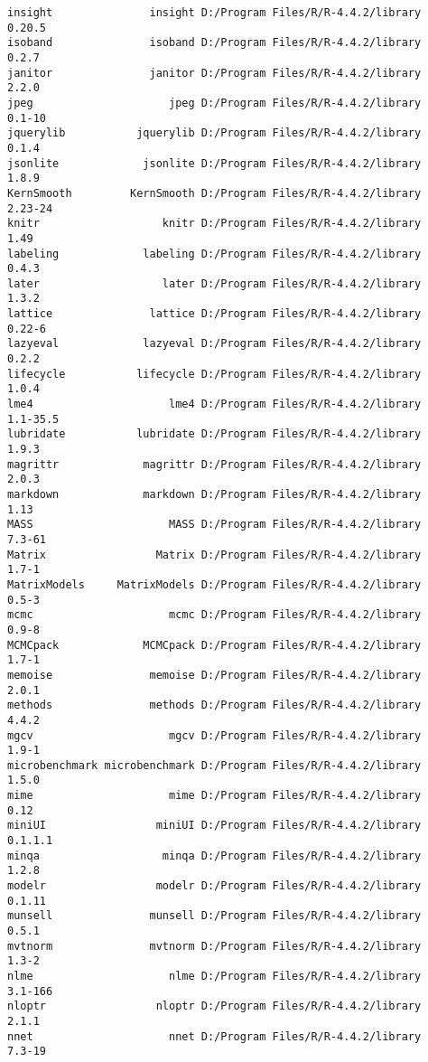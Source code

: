 \documentclass[
  letterpaper,
  DIV=11,
  numbers=noendperiod]{scrreprt}
\begin{document}
\begin{verbatim}
insight               insight D:/Program Files/R/R-4.4.2/library     0.20.5
isoband               isoband D:/Program Files/R/R-4.4.2/library      0.2.7
janitor               janitor D:/Program Files/R/R-4.4.2/library      2.2.0
jpeg                     jpeg D:/Program Files/R/R-4.4.2/library     0.1-10
jquerylib           jquerylib D:/Program Files/R/R-4.4.2/library      0.1.4
jsonlite             jsonlite D:/Program Files/R/R-4.4.2/library      1.8.9
KernSmooth         KernSmooth D:/Program Files/R/R-4.4.2/library    2.23-24
knitr                   knitr D:/Program Files/R/R-4.4.2/library       1.49
labeling             labeling D:/Program Files/R/R-4.4.2/library      0.4.3
later                   later D:/Program Files/R/R-4.4.2/library      1.3.2
lattice               lattice D:/Program Files/R/R-4.4.2/library     0.22-6
lazyeval             lazyeval D:/Program Files/R/R-4.4.2/library      0.2.2
lifecycle           lifecycle D:/Program Files/R/R-4.4.2/library      1.0.4
lme4                     lme4 D:/Program Files/R/R-4.4.2/library   1.1-35.5
lubridate           lubridate D:/Program Files/R/R-4.4.2/library      1.9.3
magrittr             magrittr D:/Program Files/R/R-4.4.2/library      2.0.3
markdown             markdown D:/Program Files/R/R-4.4.2/library       1.13
MASS                     MASS D:/Program Files/R/R-4.4.2/library     7.3-61
Matrix                 Matrix D:/Program Files/R/R-4.4.2/library      1.7-1
MatrixModels     MatrixModels D:/Program Files/R/R-4.4.2/library      0.5-3
mcmc                     mcmc D:/Program Files/R/R-4.4.2/library      0.9-8
MCMCpack             MCMCpack D:/Program Files/R/R-4.4.2/library      1.7-1
memoise               memoise D:/Program Files/R/R-4.4.2/library      2.0.1
methods               methods D:/Program Files/R/R-4.4.2/library      4.4.2
mgcv                     mgcv D:/Program Files/R/R-4.4.2/library      1.9-1
microbenchmark microbenchmark D:/Program Files/R/R-4.4.2/library      1.5.0
mime                     mime D:/Program Files/R/R-4.4.2/library       0.12
miniUI                 miniUI D:/Program Files/R/R-4.4.2/library    0.1.1.1
minqa                   minqa D:/Program Files/R/R-4.4.2/library      1.2.8
modelr                 modelr D:/Program Files/R/R-4.4.2/library     0.1.11
munsell               munsell D:/Program Files/R/R-4.4.2/library      0.5.1
mvtnorm               mvtnorm D:/Program Files/R/R-4.4.2/library      1.3-2
nlme                     nlme D:/Program Files/R/R-4.4.2/library    3.1-166
nloptr                 nloptr D:/Program Files/R/R-4.4.2/library      2.1.1
nnet                     nnet D:/Program Files/R/R-4.4.2/library     7.3-19

\end{verbatim}
\end{document}
